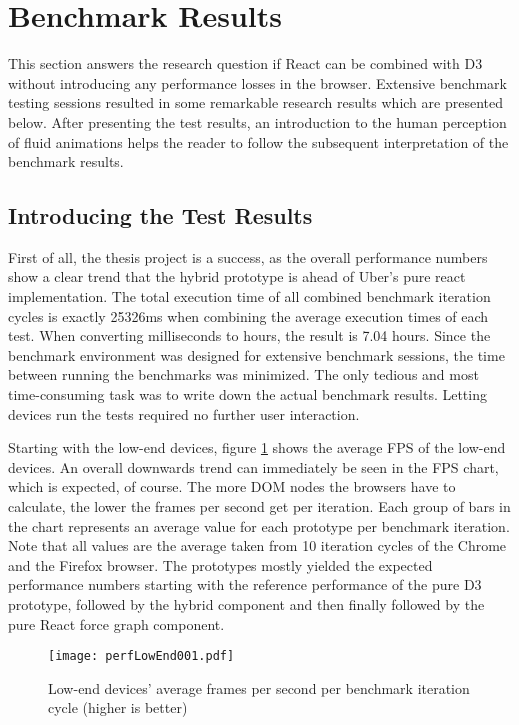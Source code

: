 \section{Benchmark Results}

This section answers the research question if React can be combined with D3 without introducing any performance losses in the browser. Extensive benchmark testing sessions resulted in some remarkable research results which are presented below. After presenting the test results, an introduction to the human perception of fluid animations helps the reader to follow the subsequent interpretation of the benchmark results.

\subsection{Introducing the Test Results}

First of all, the thesis project is a success, as the overall performance numbers show a clear trend that the hybrid prototype is ahead of Uber's pure react implementation. The total execution time of all combined benchmark iteration cycles is exactly 25326ms when combining the average execution times of each test. When converting milliseconds to hours, the result is 7.04 hours. Since the benchmark environment was designed for extensive benchmark sessions, the time between running the benchmarks was minimized. The only tedious and most time-consuming task was to write down the actual benchmark results. Letting devices run the tests required no further user interaction. 

Starting with the low-end devices, figure \ref{fig:perfLowEnd001} shows the average FPS of the low-end devices. An overall downwards trend can immediately be seen in the FPS chart, which is expected, of course. The more DOM nodes the browsers have to calculate, the lower the frames per second get per iteration. Each group of bars in the chart represents an average value for each prototype per benchmark iteration. Note that all values are the average taken from 10 iteration cycles of the Chrome and the Firefox browser. The prototypes mostly yielded the expected performance numbers starting with the reference performance of the pure D3 prototype, followed by the hybrid component and then finally followed by the pure React force graph component.

\begin{figure}
\centering
\texttt{[image: perfLowEnd001.pdf]}
\caption{Low-end devices' average frames per second per benchmark iteration cycle (higher is better)}
\label{fig:perfLowEnd001}
\end{figure}

